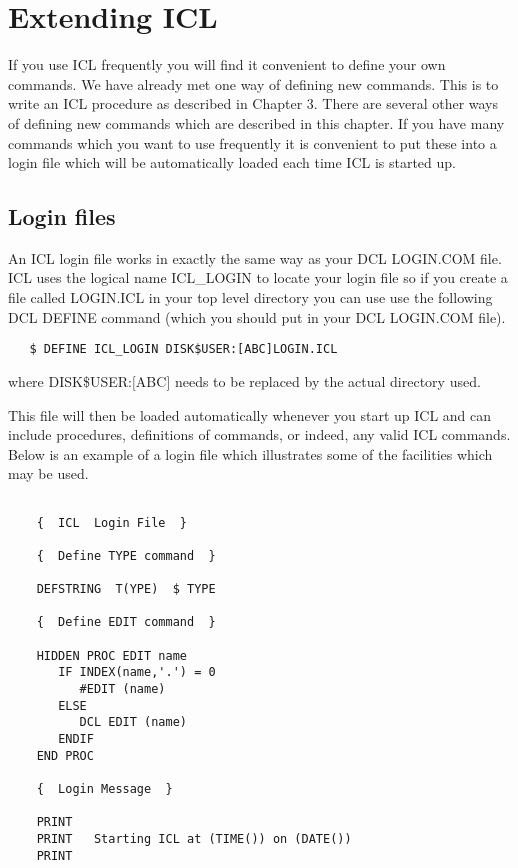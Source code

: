 \documentclass[twoside,11pt]{report}
\newcommand{\xlabel}[1]{}
\begin{document}
\chapter{\xlabel{extending_icl}Extending ICL}

If you use ICL frequently you will find it convenient to define your own
commands. We have already met one way of defining new commands. This is
to write an ICL procedure as described in Chapter 3. There are several other
ways of defining new commands which are described in this chapter. If you
have many commands which you want to use frequently it is convenient to
put these into a login file which will be automatically loaded each time
ICL is started up.

\section{\xlabel{login_files}Login files}

An ICL login file works in exactly the same way as your DCL LOGIN.COM file. ICL
uses the logical name ICL\_LOGIN to locate your login file so if you create a
file called LOGIN.ICL in your top level directory you can use use the following
DCL DEFINE command (which you should put in your DCL LOGIN.COM file).
\begin{verbatim}
   $ DEFINE ICL_LOGIN DISK$USER:[ABC]LOGIN.ICL
\end{verbatim}
where DISK\$USER:$[$ABC$]$ needs to be replaced by the actual directory used.

This file will then be loaded automatically whenever you start up ICL and
can include procedures, definitions of commands, or indeed, any valid ICL
commands. Below is an example of a login file which illustrates some of
the facilities which may be used.
\begin{verbatim}

    {  ICL  Login File  }

    {  Define TYPE command  }

    DEFSTRING  T(YPE)  $ TYPE

    {  Define EDIT command  }

    HIDDEN PROC EDIT name
       IF INDEX(name,'.') = 0
          #EDIT (name)
       ELSE
          DCL EDIT (name)
       ENDIF
    END PROC

    {  Login Message  }

    PRINT 
    PRINT   Starting ICL at (TIME()) on (DATE())
    PRINT

\end{verbatim}
   
\end{document}
